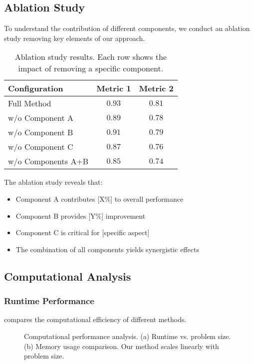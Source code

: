 \subsection{Ablation Study}
\label{subsec:ablation}

To understand the contribution of different components, we conduct an ablation study removing key elements of our approach.

\begin{table}[htbp]
\centering
\caption{Ablation study results. Each row shows the impact of removing a specific component.}
\label{tab:ablation}
\begin{tabular}{lcc}
\toprule
Configuration & Metric 1 & Metric 2 \\
\midrule
Full Method & $\mathbf{0.93}$ & $\mathbf{0.81}$ \\
w/o Component A & $0.89$ & $0.78$ \\
w/o Component B & $0.91$ & $0.79$ \\
w/o Component C & $0.87$ & $0.76$ \\
w/o Components A+B & $0.85$ & $0.74$ \\
\bottomrule
\end{tabular}
\end{table}

The ablation study reveals that:
\begin{itemize}
    \item Component A contributes [X\%] to overall performance
    \item Component B provides [Y\%] improvement 
    \item Component C is critical for [specific aspect]
    \item The combination of all components yields synergistic effects
\end{itemize}

\subsection{Computational Analysis}
\label{subsec:computational}

\subsubsection{Runtime Performance}

 compares the computational efficiency of different methods.

\begin{figure}[htbp]
\centering
\caption{Computational performance analysis. (a) Runtime vs. problem size. (b) Memory usage comparison. Our method scales linearly with problem size.}
\label{fig:runtime_analysis}
\end{figure}


